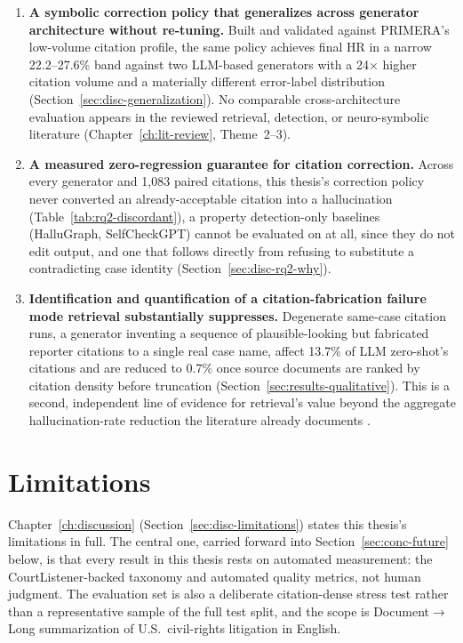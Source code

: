 \begin{enumerate}
  \item \textbf{A symbolic correction policy that generalizes across generator architecture without re-tuning.} Built and validated against PRIMERA's low-volume citation profile, the same policy achieves final HR in a narrow 22.2--27.6\% band against two LLM-based generators with a 24$\times$ higher citation volume and a materially different error-label distribution (Section~\ref{sec:disc-generalization}). No comparable cross-architecture evaluation appears in the reviewed retrieval, detection, or neuro-symbolic literature (Chapter~\ref{ch:lit-review}, Theme~2--3).
  \item \textbf{A measured zero-regression guarantee for citation correction.} Across every generator and 1{,}083 paired citations, this thesis's correction policy never converted an already-acceptable citation into a hallucination (Table~\ref{tab:rq2-discordant}), a property detection-only baselines (HalluGraph, SelfCheckGPT) cannot be evaluated on at all, since they do not edit output, and one that follows directly from refusing to substitute a contradicting case identity (Section~\ref{sec:disc-rq2-why}).
  \item \textbf{Identification and quantification of a citation-fabrication failure mode retrieval substantially suppresses.} Degenerate same-case citation runs, a generator inventing a sequence of plausible-looking but fabricated reporter citations to a single real case name, affect 13.7\% of LLM zero-shot's citations and are reduced to 0.7\% once source documents are ranked by citation density before truncation (Section~\ref{sec:results-qualitative}). This is a second, independent line of evidence for retrieval's value beyond the aggregate hallucination-rate reduction the literature already documents \cite{lewis2020rag,magesh2025hallucinationfree}.
\end{enumerate}

\section{Limitations}
\label{sec:conc-limitations}

Chapter~\ref{ch:discussion} (Section~\ref{sec:disc-limitations}) states this thesis's limitations in full. The central one, carried forward into Section~\ref{sec:conc-future} below, is that every result in this thesis rests on automated measurement: the CourtListener-backed taxonomy and automated quality metrics, not human judgment. The evaluation set is also a deliberate citation-dense stress test rather than a representative sample of the full test split, and the scope is Document$\rightarrow$Long summarization of U.S.\ civil-rights litigation in English.

